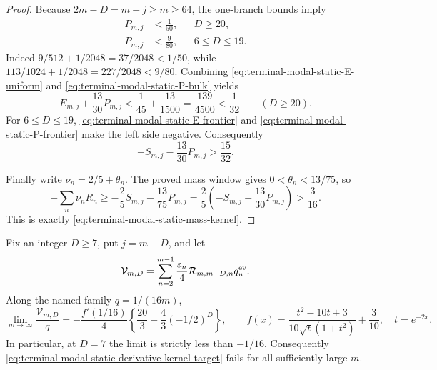 \begin{proof}
Because $2m-D=m+j\ge m\ge64$, the one-branch bounds imply
\begin{align}
 P_{m,j}&<\frac1{50},&&D\ge20,\label{eq:terminal-modal-static-P-bulk}\\
 P_{m,j}&<\frac9{80},&&6\le D\le19.
 \label{eq:terminal-modal-static-P-frontier}
\end{align}
Indeed $9/512+1/2048=37/2048<1/50$, while
$113/1024+1/2048=227/2048<9/80$.
Combining \eqref{eq:terminal-modal-static-E-uniform} and
\eqref{eq:terminal-modal-static-P-bulk} yields
\[
 E_{m,j}+\frac{13}{30}P_{m,j}
 <\frac1{45}+\frac{13}{1500}
 =\frac{139}{4500}<\frac1{32}
 \qquad(D\ge20).
\]
For $6\le D\le19$,
\eqref{eq:terminal-modal-static-E-frontier} and
\eqref{eq:terminal-modal-static-P-frontier} make the left side negative.
Consequently
\begin{equation}
 -S_{m,j}-\frac{13}{30}P_{m,j}>\frac{15}{32}.
 \label{eq:terminal-modal-static-combined-kernel}
\end{equation}

Finally write $\nu_n=2/5+\theta_n$.  The proved mass window gives
$0<\theta_n<13/75$, so
\[
 -\sum_n\nu_nR_n
 \ge-\frac25S_{m,j}-\frac{13}{75}P_{m,j}
 =\frac25\left(-S_{m,j}-\frac{13}{30}P_{m,j}\right)
 >\frac3{16}.
\]
This is exactly \eqref{eq:terminal-modal-static-mass-kernel}.
\end{proof}

\begin{lemma}
\label{lem:terminal-modal-static-derivative-stop}
Fix an integer $D\ge7$, put $j=m-D$, and let
\[
 \mathcal V_{m,D}
 =\sum_{n=2}^{m-1}\frac{\varepsilon_n}{4}
   \mathcal R_{m,m-D,n}q_n^{\rm ev}.
\]
Along the named family $q=1/(16m)$,
\begin{equation}
 \lim_{m\to\infty}\frac{\mathcal V_{m,D}}q
 =-\frac{f'(1/16)}4
 \left\{\frac{20}{3}+\frac43(-1/2)^D\right\},
 \qquad
 f(x)=\frac{t^2-10t+3}{10\sqrt t(1+t^2)}+\frac3{10},
 \quad t=e^{-2x}.
 \label{eq:terminal-modal-static-derivative-limit}
\end{equation}
In particular, at $D=7$ the limit is strictly less than $-1/16$.
Consequently
\eqref{eq:terminal-modal-static-derivative-kernel-target} fails for all
sufficiently large $m$.
\end{lemma}

